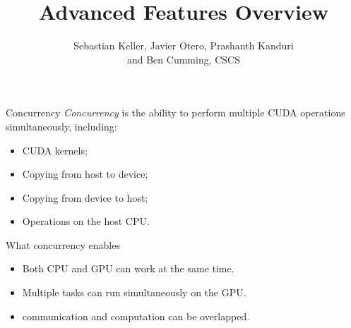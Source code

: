 \documentclass[aspectratio=43]{beamer}
\author{Sebastian Keller, Javier Otero, Prashanth Kanduri\\ and Ben Cumming, CSCS}
\title{Advanced Features Overview}
\subtitle{}
\begin{document}
\cscstitle


\begin{frame}[fragile]{Concurrency}
    \emph{Concurrency} is the ability to perform multiple CUDA operations simultaneously, including:
    \begin{itemize}
        \item CUDA kernels;
        \item Copying from host to device;
        \item Copying from device to host;
        \item Operations on the host CPU.
    \end{itemize}

    \begin{info}{What concurrency enables}
        \begin{itemize}
            \item Both CPU and GPU can work at the same time.
            \item Multiple tasks can run simultaneously on the GPU.
            \item communication and computation can be overlapped.
        \end{itemize}
    \end{info}

\end{frame}
\end{document}
